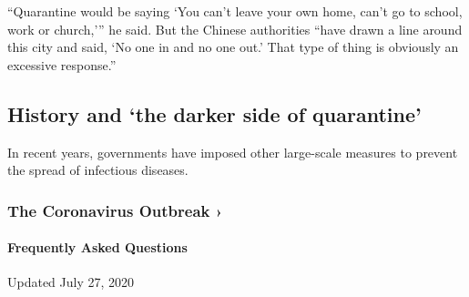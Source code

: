 ``Quarantine would be saying `You can't leave your own home, can't go to
school, work or church,''' he said. But the Chinese authorities ``have
drawn a line around this city and said, `No one in and no one out.' That
type of thing is obviously an excessive response.''

\hypertarget{history-and-the-darker-side-of-quarantine}{%
\subsection{History and `the darker side of
quarantine'}\label{history-and-the-darker-side-of-quarantine}}

In recent years, governments have imposed other large-scale measures to
prevent the spread of infectious diseases.

\href{https://www.nytimes.com/news-event/coronavirus?action=click\&pgtype=Article\&state=default\&region=MAIN_CONTENT_3\&context=storylines_faq}{}

\hypertarget{the-coronavirus-outbreak-}{%
\subsubsection{The Coronavirus Outbreak
›}\label{the-coronavirus-outbreak-}}

\hypertarget{frequently-asked-questions}{%
\paragraph{Frequently Asked
Questions}\label{frequently-asked-questions}}

Updated July 27, 2020

